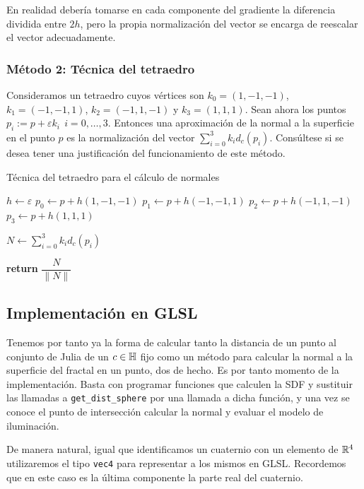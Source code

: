 En realidad debería tomarse en cada componente del gradiente la diferencia dividida entre $2h$, pero la propia normalización del vector se encarga de reescalar el vector adecuadamente.    

\subsubsection{Método 2: Técnica del tetraedro}

Consideramos un tetraedro cuyos vértices son $k_0=(1,-1,-1)$, $k_1=(-1,-1,1)$, $k_2=(-1,1,-1)$ y $k_3=(1,1,1)$. Sean ahora los puntos $p_i := p+\varepsilon k_i\ \ i=0,\dots,3$. Entonces una aproximación de la normal a la superficie en el punto $p$ es la normalización del vector $\sum_{i=0}^3 k_i d_c(p_i)$. Consúltese \cite{normals-sdf} si se desea tener una justificación del funcionamiento de este método.

\begin{algorithm}[H]
    \caption{Técnica del tetraedro para el cálculo de normales} \label{alg:normal-tetraedro}
    \begin{algorithmic}
    \State $h\gets\varepsilon$
    \State $p_0 \gets p + h(1,-1,-1)$
    \State $p_1 \gets p + h(-1,-1,1)$
    \State $p_2 \gets p + h(-1,1,-1)$
    \State $p_3 \gets p + h(1,1,1)$

    \State $N\gets \sum_{i=0}^3 k_i d_c(p_i)$

    \State \textbf{return} $\dfrac{N}{\|N\|}$
    \end{algorithmic}
\end{algorithm}

\subsection{Implementación en GLSL}

Tenemos por tanto ya la forma de calcular tanto la distancia de un punto al conjunto de Julia de un $c\in\mathbb{H}$ fijo como un método para calcular la normal a la superficie del fractal en un punto, dos de hecho. Es por tanto momento de la implementación. Basta con programar funciones que calculen la SDF y sustituir las llamadas a \verb|get_dist_sphere| por una llamada a dicha función, y una vez se conoce el punto de intersección calcular la normal y evaluar el modelo de iluminación.

De manera natural, igual que identificamos un cuaternio con un elemento de $\mathbb{R}^4$ utilizaremos el tipo \verb|vec4| para representar a los mismos en GLSL. Recordemos que en este caso es la última componente la parte real del cuaternio.


